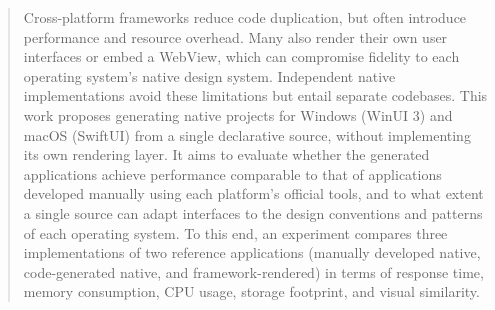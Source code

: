 \begin{abstract}
    Cross-platform frameworks reduce code duplication, but often introduce performance and resource overhead. Many also render their own user interfaces or embed a WebView, which can compromise fidelity to each operating system's native design system. Independent native implementations avoid these limitations but entail separate codebases. This work proposes generating native projects for Windows (WinUI 3) and macOS (SwiftUI) from a single declarative source, without implementing its own rendering layer. It aims to evaluate whether the generated applications achieve performance comparable to that of applications developed manually using each platform's official tools, and to what extent a single source can adapt interfaces to the design conventions and patterns of each operating system. To this end, an experiment compares three implementations of two reference applications (manually developed native, code-generated native, and framework-rendered) in terms of response time, memory consumption, CPU usage, storage footprint, and visual similarity.

\end{abstract}
